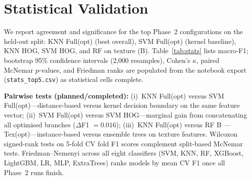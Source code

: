 \section{Statistical Validation}
\label{sec:statistics}

We report agreement and significance for the top Phase~2 configurations on the held-out split: KNN Full(opt) (best overall), SVM Full(opt) (kernel baseline), KNN HOG, SVM HOG, and RF on texture (B).
Table~\ref{tab:stats} lists macro-F1; bootstrap 95\% confidence intervals (2{,}000 resamples), Cohen's $\kappa$, paired McNemar $p$-values, and Friedman ranks are populated from the notebook export (\texttt{stats\_top5.csv}) as statistical cells complete.



\textbf{Pairwise tests (planned/completed):}
(i)~KNN Full(opt) versus SVM Full(opt)---distance-based versus kernel decision boundary on the same feature vector;
(ii)~SVM Full(opt) versus SVM HOG---marginal gain from concatenating all optimised branches ($\Delta$F1 $=0.016$);
(iii)~KNN Full(opt) versus RF B — Tex(opt)---instance-based versus ensemble trees on texture features.
Wilcoxon signed-rank tests on 5-fold CV fold F1 scores complement split-based McNemar tests.
Friedman--Nemenyi across all eight classifiers (SVM, KNN, RF, XGBoost, LightGBM, LR, MLP, ExtraTrees) ranks models by mean CV F1 once all Phase~2 runs finish.
